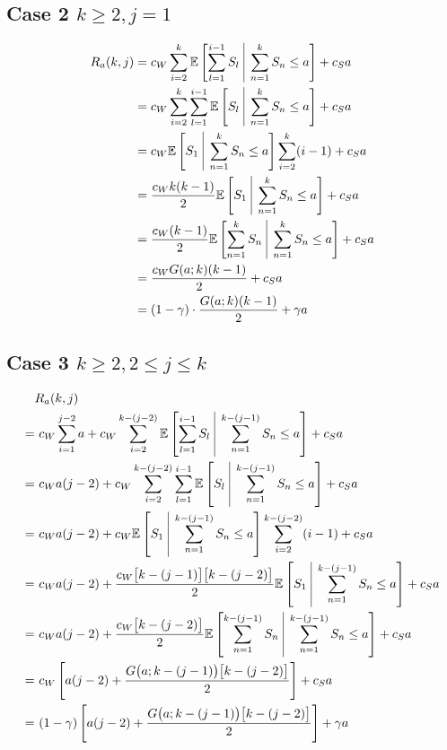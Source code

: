 \subsection{Case 2 $k \geq 2, j = 1$}
\begin{align*}
	R_{a} (k, j) & = c_{W} \sum_{i = 2}^{k} \mathbb{E} \left[ \sum_{l = 1}^{i - 1} S_{l} \ \vline \ \sum_{n = 1}^{k} S_{n} \leq a \right] + c_{S} a \\
	& = c_{W} \sum_{i = 2}^{k} \sum_{l = 1}^{i - 1} \mathbb{E} \left[ S_{l} \ \vline \ \sum_{n = 1}^{k} S_{n} \leq a \right] + c_{S} a \\
	& = c_{W} \mathbb{E} \left[ S_{1} \ \vline \ \sum_{n = 1}^{k} S_{n} \leq a \right] \sum_{i = 2}^{k} (i - 1) + c_{S} a \\
	& = \frac{c_{W} k (k - 1)}{2} \mathbb{E} \left[ S_{1} \ \vline \ \sum_{n = 1}^{k} S_{n} \leq a \right] + c_{S} a \\
	& = \frac{c_{W} (k - 1)}{2} \mathbb{E} \left[ \sum_{n = 1}^{k} S_{n} \ \vline \ \sum_{n = 1}^{k} S_{n} \leq a \right] + c_{S} a \\
	& = \frac{c_{W} G (a; k) (k - 1)}{2} + c_{S} a \\
	& = (1 - \gamma) \cdot \frac{G (a; k) (k - 1)}{2} + \gamma a
\end{align*}

\subsection{Case 3 $k \geq 2, 2 \leq j \leq k$}
\begin{align*}
	& R_{a} (k, j) \\
	= & \ c_{W} \sum_{i = 1}^{j - 2} a + c_{W} \sum_{i = 2}^{k - (j - 2)} \mathbb{E} \left[ \sum_{l = 1}^{i - 1} S_{l} \ \vline \ \sum_{n = 1}^{k - (j - 1)} S_{n} \leq a \right] + c_{S} a \\
	= & \ c_{W} a (j - 2) + c_{W} \sum_{i = 2}^{k - (j - 2)} \sum_{l = 1}^{i - 1} \mathbb{E} \left[ S_{l} \ \vline \ \sum_{n = 1}^{k - (j - 1)} S_{n} \leq a \right] + c_{S} a \\
	= & \ c_{W} a (j - 2) + c_{W} \mathbb{E} \left[ S_{1} \ \vline \ \sum_{n = 1}^{k - (j - 1)} S_{n} \leq a \right] \sum_{i = 2}^{k - (j - 2)} (i - 1) + c_{S} a \\
	= & \ c_{W} a (j - 2) + \frac{c_{W} \big[ k - (j - 1) \big] \big[ k - (j - 2) \big]}{2} \mathbb{E} \left[ S_{1} \ \vline \ \sum_{n = 1}^{k - (j - 1)} S_{n} \leq a \right] + c_{S} a \\
	= & \ c_{W} a (j - 2) + \frac{c_{W} \big[ k - (j - 2) \big]}{2} \mathbb{E} \left[ \sum_{n = 1}^{k - (j - 1)} S_{n} \ \vline \ \sum_{n = 1}^{k - (j - 1)} S_{n} \leq a \right] + c_{S} a \\
	= & \ c_{W} \left[ a (j - 2) + \frac{G \big( a; k - (j - 1) \big) \big[ k - (j - 2) \big]}{2} \right] + c_{S} a \\
	= & \ (1 - \gamma) \left[ a (j - 2) + \frac{G \big( a; k - (j - 1) \big) \big[ k - (j - 2) \big]}{2} \right] + \gamma a
\end{align*}

